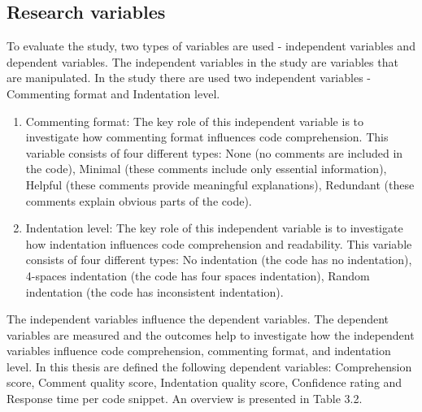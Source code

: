 \subsection{Research variables}
To evaluate the study, two types of variables are used - independent variables and dependent variables. The independent variables in the study are variables that are manipulated. In the study there are used two independent variables - Commenting format and Indentation level.

\begin{enumerate}
     \item Commenting format: The key role of this independent variable is to investigate how commenting format influences code comprehension. This variable consists of four different types: None (no comments are included in the code), Minimal (these comments include only essential information), Helpful (these comments provide meaningful explanations), Redundant (these comments explain obvious parts of the code). 

    \item Indentation level: The key role of this independent variable is to investigate how indentation influences code comprehension and readability. This variable consists of four different types: No indentation (the code has no indentation), 4-spaces indentation (the code has four spaces indentation), Random indentation (the code has inconsistent indentation). 
\end{enumerate}


The independent variables influence the dependent variables. The dependent variables are measured and the outcomes help to investigate how the independent variables influence code comprehension, commenting format, and indentation level. In this thesis are defined the following dependent variables: Comprehension score, Comment quality score, Indentation quality score, Confidence rating and  Response time per code snippet. An overview is presented in Table 3.2.


